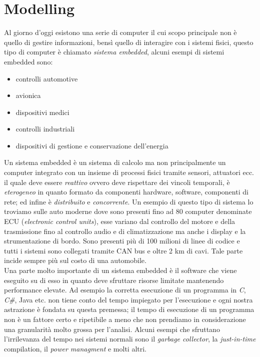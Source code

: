 \section{Modelling}\label{capitolo2}
Al giorno d'oggi esistono una serie di computer il cui scopo principale non è quello di gestire informazioni, bensì quello di interagire con i sistemi fisici, questo tipo di computer è chiamato \emph{sistema embedded}, alcuni esempi di sistemi embedded sono:
\begin{itemize}
\item controlli automotive
\item avionica
\item dispositivi medici
\item controlli industriali
\item dispositivi di gestione e conservazione dell'energia
\end{itemize}
Un sistema embedded è un sistema di calcolo ma non principalmente un computer integrato con un insieme di processi fisici tramite sensori, attuatori ecc. il quale deve essere \emph{reattivo} ovvero deve rispettare dei vincoli temporali, è \emph{eterogeneo} in quanto formato da componenti hardware, software, componenti di rete; ed infine è \emph{distribuito} e \emph{concorrente}.
Un esempio di questo tipo di sistema lo troviamo sulle auto moderne dove sono presenti fino ad 80 computer denominate ECU (\emph{electronic control units}), esse variano dal controllo del motore e della trasmissione fino al controllo audio e di climatizzazione ma anche i display e la strumentazione di bordo. Sono presenti più di 100 milioni di linee di codice e tutti i sistemi sono collegati tramite CAN bus e oltre 2 km di cavi. Tale parte incide sempre più sul costo di una automobile.\\
Una parte molto importante di un sistema embedded è il software che viene eseguito su di esso in quanto deve sfruttare risorse limitate mantenendo performance elevate. Ad esempio la corretta esecuzione di un programma in \emph{C}, \emph{C\#}, Java etc. non tiene conto del tempo impiegato per l'esecuzione e ogni nostra astrazione è fondata su questa premessa; il tempo di esecuzione di un programma non è un fattore certo e ripetibile a meno che non prendiamo in considerazione una granularità molto grossa per l'analisi. Alcuni esempi che sfruttano l'irrilevanza del tempo nei sistemi normali sono il \emph{garbage collector}, la \emph{just-in-time} compilation, il \emph{power managment} e molti altri.\\

